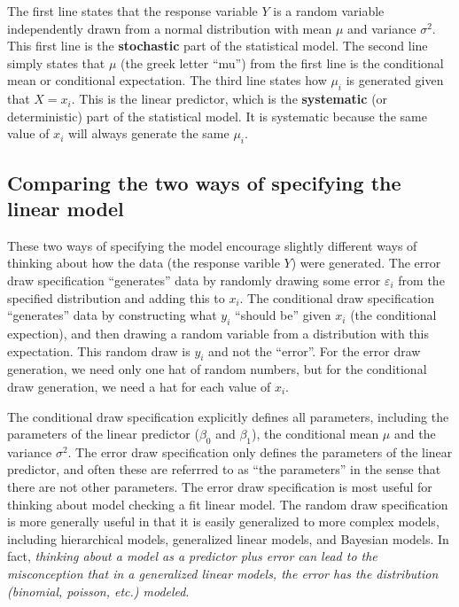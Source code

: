 \documentclass[]{book}
\begin{document}
The first line states that the response variable \(Y\) is a random
variable independently drawn from a normal distribution with mean
\(\mu\) and variance \(\sigma^2\). This first line is the
\textbf{stochastic} part of the statistical model. The second line
simply states that \(\mu\) (the greek letter ``mu'') from the first line
is the conditional mean or conditional expectation. The third line
states how \(\mu_i\) is generated given that \(X=x_i\). This is the
linear predictor, which is the \textbf{systematic} (or deterministic)
part of the statistical model. It is systematic because the same value
of \(x_i\) will always generate the same \(\mu_i\).

\subsection{Comparing the two ways of specifying the linear
model}\label{comparing-the-two-ways-of-specifying-the-linear-model}

These two ways of specifying the model encourage slightly different ways
of thinking about how the data (the response varible \(Y\)) were
generated. The error draw specification ``generates'' data by randomly
drawing some error \(\varepsilon_i\) from the specified distribution and
adding this to \(x_i\). The conditional draw specification ``generates''
data by constructing what \(y_i\) ``should be'' given \(x_i\) (the
conditional expection), and then drawing a random variable from a
distribution with this expectation. This random draw is \(y_i\) and not
the ``error''. For the error draw generation, we need only one hat of
random numbers, but for the conditional draw generation, we need a hat
for each value of \(x_i\).

The conditional draw specification explicitly defines all parameters,
including the parameters of the linear predictor (\(\beta_0\) and
\(\beta_1\)), the conditional mean \(\mu\) and the variance
\(\sigma^2\). The error draw specification only defines the parameters
of the linear predictor, and often these are referrred to as ``the
parameters'' in the sense that there are not other parameters. The error
draw specification is most useful for thinking about model checking a
fit linear model. The random draw specification is more generally useful
in that it is easily generalized to more complex models, including
hierarchical models, generalized linear models, and Bayesian models. In
fact, \emph{thinking about a model as a predictor plus error can lead to
the misconception that in a generalized linear models, the error has the
distribution (binomial, poisson, etc.) modeled}.
\end{document}
